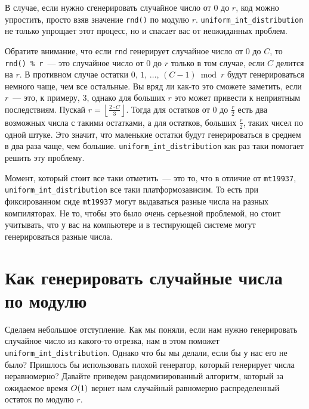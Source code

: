 В случае, если нужно сгенерировать случайное число от $0$ до $r$, код можно упростить, просто взяв значение \verb+rnd()+ по модулю $r$. \verb+uniform_int_distribution+ не только упрощает этот процесс, но и спасает вас от неожиданных проблем.

Обратите внимание, что если \verb+rnd+ генерирует случайное число от $0$ до $C$, то \verb+rnd() % r+~--- это случайное число от $0$ до $r$ только в том случае, если $C$ делится на $r$. В противном случае остатки $0$, $1$, $\ldots$, $\left(C - 1\right) \bmod r$ будут генерироваться немного чаще, чем все остальные. Вы вряд ли как-то это сможете заметить, если $r$~--- это, к примеру, $3$, однако для больших $r$ это может привести к неприятным последствиям. Пускай $r = \left\lfloor \frac{2 \cdot C}{3} \right\rfloor$. Тогда для остатков от $0$ до $\frac{r}{2}$ есть два возможных числа с такими остатками, а для остатков, больших $\frac{r}{2}$, таких чисел по одной штуке. Это значит, что маленькие остатки будут генерироваться в среднем в два раза чаще, чем большие. \verb+uniform_int_distribution+ как раз таки помогает решить эту проблему.

Момент, который стоит все таки отметить~--- это то, что в отличие от \verb+mt19937+, \verb+uniform_int_distribution+ все таки платформозависим. То есть при фиксированном сиде \verb+mt19937+ могут выдаваться разные числа на разных компиляторах. Не то, чтобы это было очень серьезной проблемой, но стоит учитывать, что у вас на компьютере и в тестирующей системе могут генерироваться разные числа.

\section{Как генерировать случайные числа по модулю}

Сделаем небольшое отступление. Как мы поняли, если нам нужно генерировать случайное число из какого-то отрезка, нам в этом поможет \verb+uniform_int_distribution+. Однако что бы мы делали, если бы у нас его не было? Пришлось бы использовать плохой генератор, который генерирует числа неравномерно? Давайте приведем рандомизированный алгоритм, который за ожидаемое время $O(1)$ вернет нам случайный равномерно распределенный остаток по модулю $r$.

